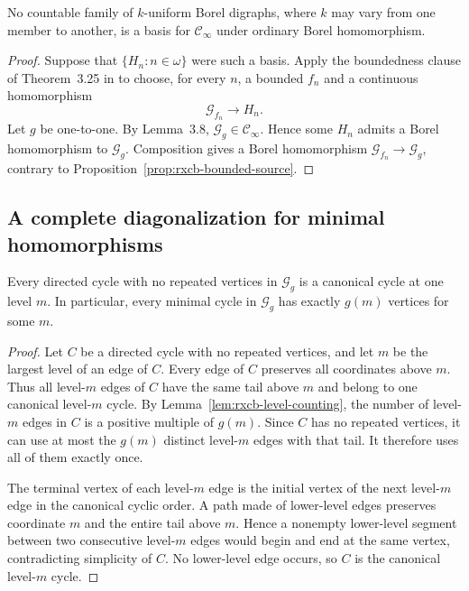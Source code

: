 \begin{corollary}
\label{cor:rxcb-no-uniform-basis}
No countable family of $k$-uniform Borel digraphs, where $k$ may vary
from one member to another, is a basis for $\mathcal C_\infty$ under
ordinary Borel homomorphism.
\end{corollary}

\begin{proof}
Suppose that $\{H_n:n\in\omega\}$ were such a basis.  Apply the
boundedness clause of Theorem~3.25 in \cite{RX24} to choose, for every
$n$, a bounded $f_n$ and a continuous homomorphism
\[
  \mathcal G_{f_n}\longrightarrow H_n.
\]
Let $g$ be one-to-one.  By Lemma~3.8,
$\mathcal G_g\in\mathcal C_\infty$.  Hence some $H_n$ admits a Borel
homomorphism to $\mathcal G_g$.  Composition gives a Borel
homomorphism $\mathcal G_{f_n}\to\mathcal G_g$, contrary to
Proposition~\ref{prop:rxcb-bounded-source}.
\end{proof}

\subsection{A complete diagonalization for minimal homomorphisms}
\label{subsec:rxcb-minimal}

\begin{lemma}
\label{lem:rxcb-cycle-rigidity}
Every directed cycle with no repeated vertices in $\mathcal G_g$ is a
canonical cycle at one level $m$.  In particular, every minimal cycle
in $\mathcal G_g$ has exactly $g(m)$ vertices for some $m$.
\end{lemma}

\begin{proof}
Let $C$ be a directed cycle with no repeated vertices, and let $m$ be
the largest level of an edge of $C$.  Every edge of $C$ preserves all
coordinates above $m$.  Thus all level-$m$ edges of $C$ have the same
tail above $m$ and belong to one canonical level-$m$ cycle.  By
Lemma~\ref{lem:rxcb-level-counting}, the number of level-$m$ edges in
$C$ is a positive multiple of $g(m)$.  Since $C$ has no repeated
vertices, it can use at most the $g(m)$ distinct level-$m$ edges with
that tail.  It therefore uses all of them exactly once.

The terminal vertex of each level-$m$ edge is the initial vertex of
the next level-$m$ edge in the canonical cyclic order.  A path made of
lower-level edges preserves coordinate $m$ and the entire tail above
$m$.  Hence a nonempty lower-level segment between two consecutive
level-$m$ edges would begin and end at the same vertex, contradicting
simplicity of $C$.  No lower-level edge occurs, so $C$ is the canonical
level-$m$ cycle.
\end{proof}

